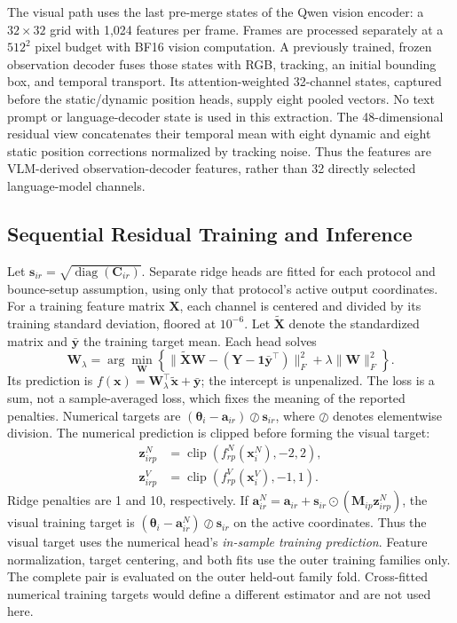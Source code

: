 \documentclass{ieeeaccess}
\begin{document}
The visual path uses the last pre-merge states of the Qwen vision encoder: a $32\times32$ grid with 1,024 features per frame. Frames are processed separately at a $512^2$ pixel budget with BF16 vision computation. A previously trained, frozen observation decoder fuses those states with RGB, tracking, an initial bounding box, and temporal transport. Its attention-weighted 32-channel states, captured before the static/dynamic position heads, supply eight pooled vectors. No text prompt or language-decoder state is used in this extraction. The 48-dimensional residual view concatenates their temporal mean with eight dynamic and eight static position corrections normalized by tracking noise. Thus the features are VLM-derived observation-decoder features, rather than 32 directly selected language-model channels.

\subsection{Sequential Residual Training and Inference}
Let $\bm s_{ir}=\sqrt{\operatorname{diag}(\bm C_{ir})}$. Separate ridge heads are fitted for each protocol and bounce-setup assumption, using only that protocol's active output coordinates. For a training feature matrix $\bm X$, each channel is centered and divided by its training standard deviation, floored at $10^{-6}$. Let $\tilde{\bm X}$ denote the standardized matrix and $\bar{\bm y}$ the training target mean. Each head solves
\begin{equation}
\bm W_\lambda=\arg\min_{\bm W}\left\{\|\tilde{\bm X}\bm W-(\bm Y-\bm 1\bar{\bm y}^{\top})\|_F^2+\lambda\|\bm W\|_F^2\right\}.
\label{eq:ridge}
\end{equation}
Its prediction is $f(\bm x)=\bm W_\lambda^\top\tilde{\bm x}+\bar{\bm y}$; the intercept is unpenalized. The loss is a sum, not a sample-averaged loss, which fixes the meaning of the reported penalties. Numerical targets are $(\bm\theta_i-\bm a_{ir})\oslash\bm s_{ir}$, where $\oslash$ denotes elementwise division. The numerical prediction is clipped before forming the visual target:
\begin{align}
\bm z^N_{irp}&=\operatorname{clip}(f^N_{rp}(\bm x_i^N),-2,2),\\
\bm z^V_{irp}&=\operatorname{clip}(f^V_{rp}(\bm x_i^V),-1,1).
\end{align}
Ridge penalties are 1 and 10, respectively. If $\bm a^N_{ir}=\bm a_{ir}+\bm s_{ir}\odot(\bm M_{ip}\bm z^N_{irp})$, the visual training target is $(\bm\theta_i-\bm a^N_{ir})\oslash\bm s_{ir}$ on the active coordinates. Thus the visual target uses the numerical head's \emph{in-sample training prediction}. Feature normalization, target centering, and both fits use the outer training families only. The complete pair is evaluated on the outer held-out family fold. Cross-fitted numerical training targets would define a different estimator and are not used here.
\end{document}
